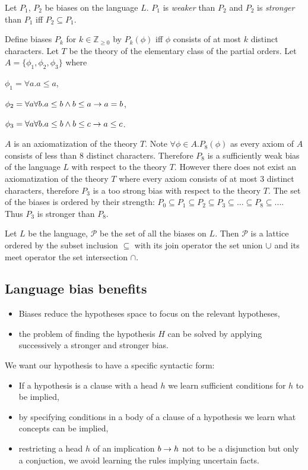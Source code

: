 \begin{defn}
Let $P_1$, $P_2$ be biases on the language $L$. $P_1$ is \emph{weaker} than $P_2$ and $P_2$ is \emph{stronger} than $P_1$ iff $P_2 \subseteq P_1$.
\end{defn}

\begin{exmp}
Define biases $P_k$ for $k \in \mathbb{Z}_{\ge 0}$ by $P_k(\phi)$ iff $\phi$ consists of at most $k$ distinct characters. Let $T$ be the theory of the elementary class of the partial orders. Let $A=\{\phi_1, \phi_2, \phi_3\}$ where

$\phi_1=\forall a. a \le a$,

$\phi_2=\forall a \forall b. a \le b \wedge b \le a \to a=b$,

$\phi_3=\forall a \forall b. a \le b \wedge b \le c \to a \le c$.

$A$ is an axiomatization of the theory $T$. Note $\forall \phi \in A. P_8(\phi)$ as every axiom of $A$ consists of less than $8$ distinct characters. Therefore $P_8$ is a sufficiently weak bias of the language $L$ with respect to the theory $T$. However there does not exist an axiomatization of the theory $T$ where every axiom consists of at most $3$ distinct characters, therefore $P_3$ is a too strong bias with respect to the theory $T$. The set of the biases is ordered by their strength:
$P_0 \subseteq P_1 \subseteq P_2 \subseteq P_3 \subseteq ... \subseteq P_8 \subseteq ...$. Thus $P_3$ is stronger than $P_8$.
\end{exmp}

\begin{remark}
Let $L$ be the language, $\mathcal{P}$ be the set of all the biases on $L$. Then $\mathcal{P}$ is a lattice ordered by the subset inclusion $\subseteq$ with its join operator the set union $\cup$ and its meet operator the set intersection $\cap$.
\end{remark}

\subsection{Language bias benefits}
\begin{itemize}
\item Biases reduce the hypotheses space to focus on the relevant hypotheses,
\item the problem of finding the hypothesis $H$ can be solved by applying successively a stronger and stronger bias.
\end{itemize}
We want our hypothesis to have a specific syntactic form:
\begin{itemize}
\item If a hypothesis is a clause with a head $h$ we learn sufficient conditions for $h$ to be implied,
\item by specifying conditions in a body of a clause of a hypothesis we learn what concepts can be implied,
\item restricting a head $h$ of an implication $b \to h$ not to be a disjunction but only a conjuction, we avoid learning the rules implying uncertain facts.
\end{itemize}

